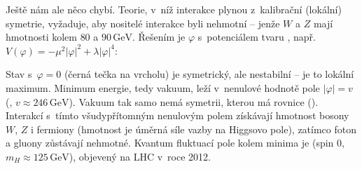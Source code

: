 Ještě nám ale něco chybí. Teorie, v~níž interakce plynou z~kalibrační (lokální) symetrie, vyžaduje, aby nositelé interakce byli nehmotní -- jenže $W$ a $Z$ mají hmotnosti kolem $80$ a $90\,\mathrm{GeV}$. Řešením je  $\varphi$ s~potenciálem tvaru , např.\ $V(\varphi) = -\mu^2|\varphi|^2 + \lambda|\varphi|^4$:
\begin{center}
\end{center}
Stav s~$\varphi=0$ (černá tečka na vrcholu) je symetrický, ale nestabilní -- je to lokální maximum. Minimum energie, tedy vakuum, leží v~nenulové hodnotě pole $|\varphi| = v$ (, $v\approx246\,\mathrm{GeV}$). Vakuum tak samo nemá symetrii, kterou má rovnice (). Interakcí s~tímto všudypřítomným nenulovým polem získávají hmotnost bosony $W$, $Z$ i fermiony (hmotnost je úměrná síle vazby na Higgsovo pole), zatímco foton a gluony zůstávají nehmotné. Kvantum fluktuací pole kolem minima je  (spin 0, $m_H\approx125\,\mathrm{GeV}$), objevený na LHC v~roce 2012.
